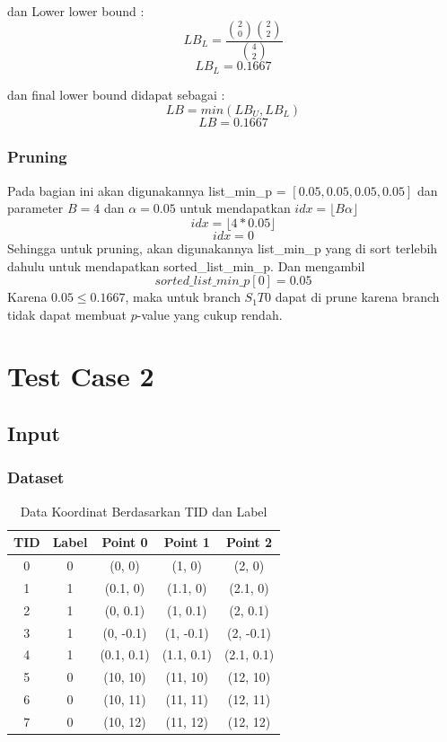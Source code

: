 \documentclass[a4paper,twoside]{article}
\begin{document}
dan Lower lower bound :
\[ LB_L = \frac{\binom{2}{0}\binom{2}{2}}{\binom{4}{2}} \]
\[ LB_L = 0.1667 \]

dan final lower bound didapat sebagai :
\[ LB = min(LB_U, LB_L) \]
\[ LB = 0.1667 \]

\subsubsection{Pruning}
Pada bagian ini akan digunakannya list\_min\_p = $[0.05, 0.05, 0.05, 0.05]$ dan parameter $B = 4$ dan $\alpha = 0.05$
untuk mendapatkan $idx = \lfloor B\alpha \rfloor$
\[ idx = \lfloor 4*0.05 \rfloor \]
\[ idx = 0 \]
Sehingga untuk pruning, akan digunakannya list\_min\_p yang di sort terlebih dahulu untuk mendapatkan sorted\_list\_min\_p.
Dan mengambil \[ sorted\_list\_min\_p[0] = 0.05 \]
Karena $0.05 \leq 0.1667$, maka untuk branch $S_1{T0}$ dapat di prune karena branch tidak dapat membuat $p$-value yang cukup rendah.

\section{Test Case 2}
\subsection{Input}
\subsubsection{Dataset}
\begin{table}[H]
    \centering
    \caption{Data Koordinat Berdasarkan TID dan Label}
    \label{tab:data_koordinat}
    \begin{tabular}{ccccc}
        \hline
        \textbf{TID} & \textbf{Label} & \textbf{Point 0} & \textbf{Point 1} & \textbf{Point 2} \\ \hline
        0 & 0 & (0, 0) & (1, 0) & (2, 0) \\ 
        1 & 1 & (0.1, 0) & (1.1, 0) & (2.1, 0) \\ 
        2 & 1 & (0, 0.1) & (1, 0.1) & (2, 0.1) \\ 
        3 & 1 & (0, -0.1) & (1, -0.1) & (2, -0.1) \\
        4 & 1 & (0.1, 0.1) & (1.1, 0.1) & (2.1, 0.1) \\
        5 & 0 & (10, 10) & (11, 10) & (12, 10) \\ 
        6 & 0 & (10, 11) & (11, 11) & (12, 11) \\ 
        7 & 0 & (10, 12) & (11, 12) & (12, 12) \\ \hline
    \end{tabular}
\end{table}
\end{document}
